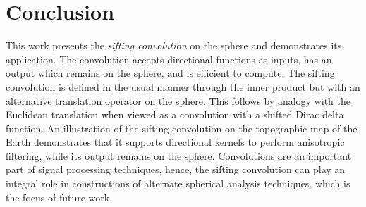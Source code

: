 



\section{Conclusion}\label{sec:chapter2_conclusion}

This work presents the \emph{sifting convolution} on the sphere and demonstrates its application.
The convolution accepts directional functions as inputs, has an output which remains on the sphere, and is efficient to compute.
The sifting convolution is defined in the usual manner through the inner product but with an alternative translation operator on the sphere.
This follows by analogy with the Euclidean translation when viewed as a convolution with a shifted Dirac delta function.
An illustration of the sifting convolution on the topographic map of the Earth demonstrates that it supports directional kernels to perform anisotropic filtering, while its output remains on the sphere.
Convolutions are an important part of signal processing techniques, hence, the sifting convolution can play an integral role in constructions of alternate spherical analysis techniques, which is the focus of future work.
